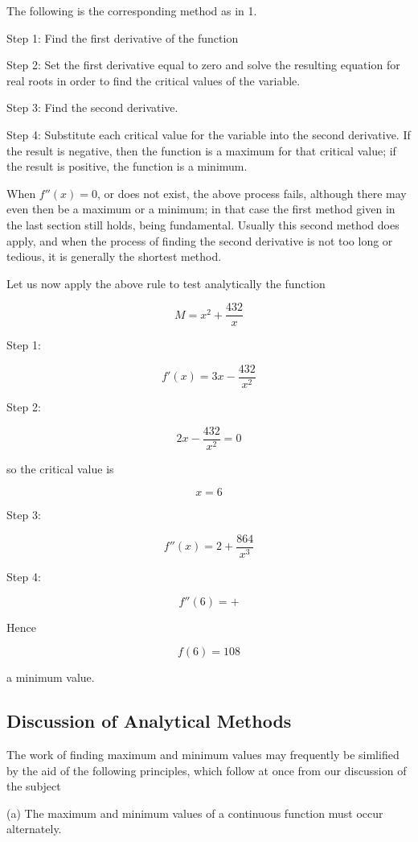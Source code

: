 \documentclass[12pt]{article}
\begin{document}
The following is the corresponding method as in 1.

Step 1:  Find the first derivative of the function

Step 2:  Set the first derivative equal to zero and solve the resulting equation for real roots in order to find the critical values of the variable.

Step 3:  Find the second derivative.

Step 4:  Substitute each critical value for the variable into the second derivative.  If the result is negative, then the function is a maximum for that critical value;  if the result is positive, the function is a minimum.

When $f''(x) = 0$, or does not exist, the above process fails, although there may even then be a maximum or a minimum; in that case the first method given in the last section still holds, being fundamental.  Usually this second method does apply, and when the process of finding the second derivative is not too long or tedious, it is generally the shortest method.

Let us now apply the above rule to test analytically the function

$$ M = x^2 + \frac{432}{x} $$

Step 1:

$$ f'(x) = 3x - \frac{432}{x^2} $$

Step 2:

$$ 2x - \frac{432}{x^2} = 0 $$

so the critical value is 

$$ x = 6 $$

Step 3:

$$ f''(x) = 2 + \frac{864}{x^3} $$

Step 4:

$$ f''(6) = + $$

Hence

$$ f(6) = 108 $$

a minimum value.

\subsection{Discussion of Analytical Methods}

The work of finding maximum and minimum values may frequently be simlified by the aid of the following principles, which follow at once from our discussion of the subject

(a) The maximum and minimum values of a continuous function must occur alternately.
\end{document}
